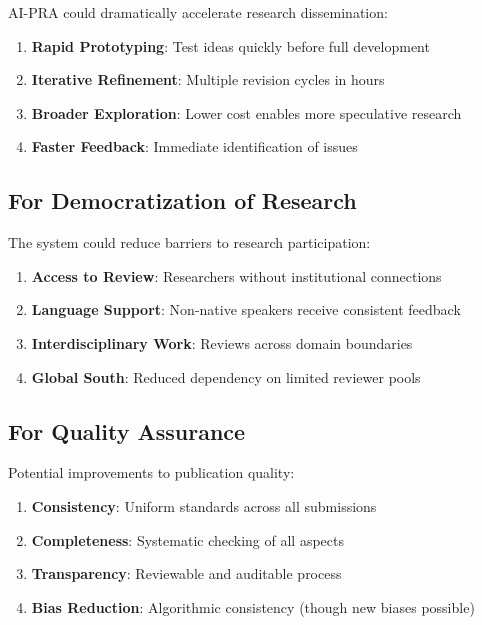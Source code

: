 \documentclass[11pt,a4paper]{article}
\begin{document}
AI-PRA could dramatically accelerate research dissemination:

\begin{enumerate}
    \item \textbf{Rapid Prototyping}: Test ideas quickly before full development
    \item \textbf{Iterative Refinement}: Multiple revision cycles in hours
    \item \textbf{Broader Exploration}: Lower cost enables more speculative research
    \item \textbf{Faster Feedback}: Immediate identification of issues
\end{enumerate}

\subsection{For Democratization of Research}

The system could reduce barriers to research participation:

\begin{enumerate}
    \item \textbf{Access to Review}: Researchers without institutional connections
    \item \textbf{Language Support}: Non-native speakers receive consistent feedback
    \item \textbf{Interdisciplinary Work}: Reviews across domain boundaries
    \item \textbf{Global South}: Reduced dependency on limited reviewer pools
\end{enumerate}

\subsection{For Quality Assurance}

Potential improvements to publication quality:

\begin{enumerate}
    \item \textbf{Consistency}: Uniform standards across all submissions
    \item \textbf{Completeness}: Systematic checking of all aspects
    \item \textbf{Transparency}: Reviewable and auditable process
    \item \textbf{Bias Reduction}: Algorithmic consistency (though new biases possible)
\end{enumerate}
\end{document}
